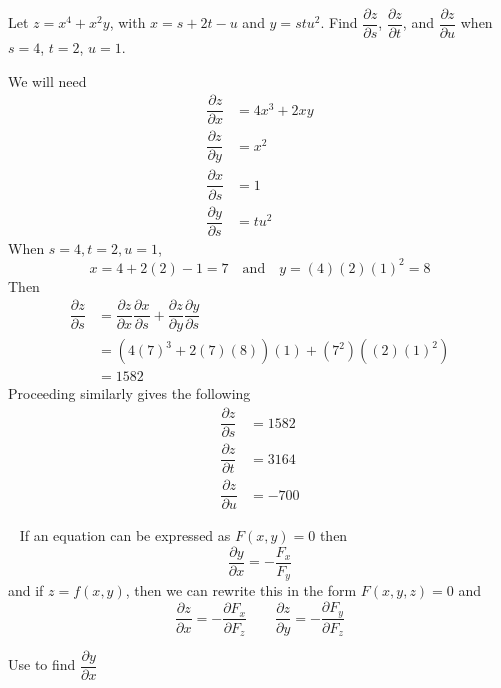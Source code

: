 \documentclass[12pt]{exam}
\newcommand{\pd}[2]{\dfrac{\partial #1}{\partial #2}}
\begin{document}
\begin{questions}
\question Let \(z=x^4+x^2y\), with \(x=s+2t-u\) and \(y=stu^2\).
Find \(\pd{z}{s}\), \(\pd{z}{t}\), and \(\pd{z}{u}\) when \(s=4\), \(t=2\), \(u=1\).
    \ifprintanswers
        \begin{solution}
            We will need
            \begin{align*}
                \pd{z}{x} & = 4x^3+2xy\\
                \pd{z}{y}&=x^2\\
                \pd{x}{s}&=1\\
                \pd{y}{s}&=tu^2
            \end{align*}
            When \(s=4,t=2,u=1\), 
            \[
                x=4+2(2)-1 = 7\quad\text{and}\quad y=(4)(2)(1)^2=8
            \]
            Then 
            \begin{align*}
                \pd{z}{s} & = \pd{z}{x}\pd{x}{s}+\pd{z}{y}\pd{y}{s}\\
                    & = \left(4(7)^3+2(7)(8)\right)\left(1\right)+\left(7^2\right)\left((2)(1)^2\right)\\
                        & = 1582
            \end{align*}
            Proceeding similarly gives the following
            \begin{align*}         
                \pd{z}{s} & = 1582\\
                \pd{z}{t} & = 3164\\
                \pd{z}{u} & = -700 
            \end{align*}
        \end{solution}
    \else
        \vfill
    \fi

\newpage

\begin{info}
~
If an equation can be expressed as \(F(x,y)=0\) then 
    \begin{equation} \label{eqn:implicit_xy}
        \pd{y}{x} = -\dfrac{F_x}{F_y}
    \end{equation}
and if \(z=f(x,y)\), then we can rewrite this in the form \(F(x,y,z)=0\) and
    \begin{equation}\label{eqn:implicit_xyz}
        \pd{z}{x} = -\pd{F_x}{F_z} \qquad \pd{z}{y}=-\pd{F_y}{F_z}
    \end{equation}
\end{info}

\question Use  to find \(\pd{y}{x}\)
\end{questions}
\end{document}

